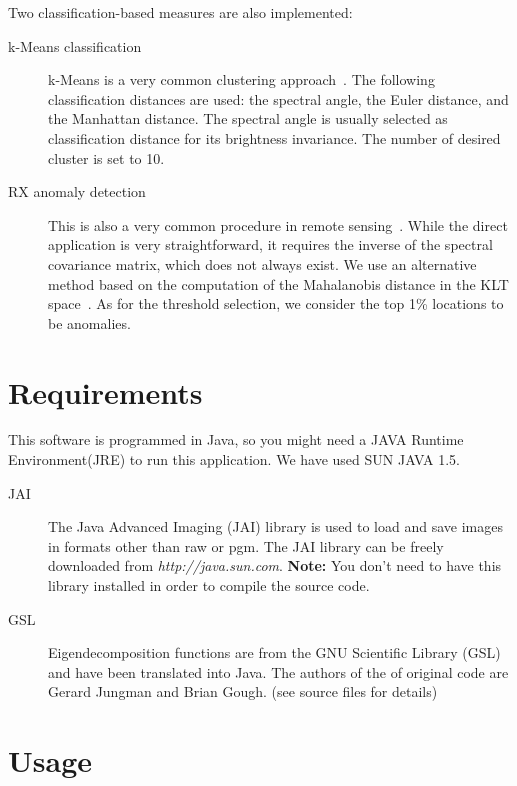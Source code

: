 \documentclass[a4paper,10pt]{article}
\begin{document}
Two classification-based measures are also implemented:

\begin{description}
 \item[k-Means classification]
k-Means is a very common clustering approach~\cite{Mac67}. 
The following classification distances are used: the spectral angle, the Euler distance, and the Manhattan distance.
The spectral angle is usually selected as classification distance for its brightness invariance.
The number of desired cluster is set to 10.

 \item[\ac{RX} anomaly detection]
This is also a very common procedure in remote sensing~\cite{RY90}. While the direct application is very straightforward, it requires the
inverse of the spectral covariance matrix, which does not always exist. We use an alternative method based on the computation of the Mahalanobis distance in the \ac{KLT} space~\cite{MJM00}. As for the threshold selection, we consider the top 1\% locations to be anomalies.

\end{description}

\section{Requirements}

This software is programmed in Java, so you might need a JAVA Runtime Environment(JRE) to run this application.
We have used SUN JAVA 1.5. 

\begin{description}
\item[JAI] The Java Advanced Imaging (JAI) library is used to load and save images in formats
other than raw or pgm. The JAI library can be freely downloaded from \emph{http://java.sun.com}.
\textbf{Note:} You don't need to have this library installed in order to compile the source code.

\item[GSL] Eigendecomposition functions are from the GNU Scientific Library (GSL) and have been translated into Java.
The authors of the of original code are Gerard Jungman and Brian Gough. (see source files for details)
\end{description}

\section{Usage}
\end{document}
